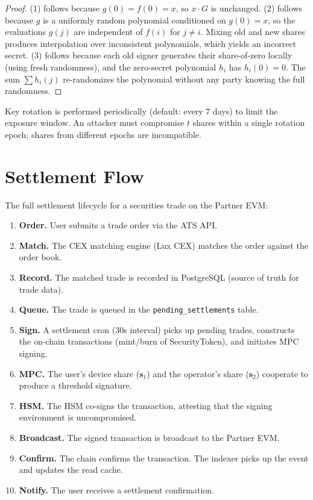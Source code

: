 \documentclass[11pt,a4paper]{article}
\begin{document}
\begin{proof}
(1) follows because $g(0) = f(0) = x$, so $x \cdot G$ is unchanged.
(2) follows because $g$ is a uniformly random polynomial conditioned on
$g(0) = x$, so the evaluations $g(j)$ are independent of $f(i)$ for
$j \neq i$.  Mixing old and new shares produces interpolation over
inconsistent polynomials, which yields an incorrect secret.
(3) follows because each old signer generates their share-of-zero
locally (using fresh randomness), and the zero-secret polynomial
$h_i$ has $h_i(0) = 0$.  The sum $\sum h_i(j)$ re-randomizes the
polynomial without any party knowing the full randomness.
\end{proof}

Key rotation is performed periodically (default: every 7 days) to
limit the exposure window.  An attacker must compromise $t$ shares
within a single rotation epoch; shares from different epochs are
incompatible.

\section{Settlement Flow}
\label{sec:settlement}

The full settlement lifecycle for a securities trade on the Partner EVM:

\begin{enumerate}[nosep]
  \item \textbf{Order.}  User submits a trade order via the ATS API.
  \item \textbf{Match.}  The CEX matching engine (Lux CEX) matches
        the order against the order book.
  \item \textbf{Record.}  The matched trade is recorded in PostgreSQL
        (source of truth for trade data).
  \item \textbf{Queue.}  The trade is queued in the
        \texttt{pending\_settlements} table.
  \item \textbf{Sign.}  A settlement cron (30s interval) picks up
        pending trades, constructs the on-chain transactions
        (mint/burn of SecurityToken), and initiates MPC signing.
  \item \textbf{MPC.}  The user's device share ($\mathbf{s}_1$) and
        the operator's share ($\mathbf{s}_2$) cooperate to produce
        a threshold signature.
  \item \textbf{HSM.}  The HSM co-signs the transaction, attesting
        that the signing environment is uncompromised.
  \item \textbf{Broadcast.}  The signed transaction is broadcast to
        the Partner EVM.
  \item \textbf{Confirm.}  The chain confirms the transaction.  The
        indexer picks up the event and updates the read cache.
  \item \textbf{Notify.}  The user receives a settlement confirmation.
\end{enumerate}
\end{document}
